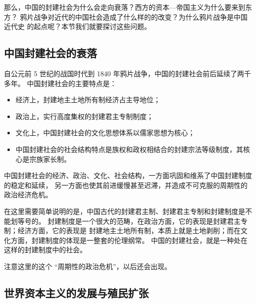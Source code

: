 \documentclass[utf-8, 10pt]{article}
\begin{document}
那么，中国的封建社会为什么会走向衰落？西方的资本—帝国主义为什么要来到东方？
鸦片战争对近代的中国社会造成了什么样的的改变？为什么鸦片战争是中国近代史
的起点呢？本节我们就要探讨这些问题。

\subsection{中国封建社会的衰落}


自公元前 5 世纪的战国时代到 1840 年鸦片战争，中国的封建社会前后延续了两千多年。
中国封建社会的主要特点是：
\begin{itemize}[itemsep=0pt]
    \item 经济上，封建地主土地所有制经济占主导地位；
    \item 政治上，实行高度集权的封建君主专制制度；
    \item 文化上，中国封建社会的文化思想体系以儒家思想为核心；
    \item 中国封建社会的社会结构特点是族权和政权相结合的封建宗法等级制度，其核心是宗族家长制。
\end{itemize}
中国封建社会的经济、政治、文化、社会结构，一方面巩固和维系了中国封建制度的稳定和延续，
另一方面也使其前进缓慢甚至迟滞，并造成不可克服的周期性的政治经济危机。
\begin{remark}
    在这里需要简单说明的是，中国古代的封建君主制、封建君主专制和封建制度是不能划等号的。
    封建制度是一个很大的范畴，在政治方面，它的表现是封建君主专制；经济方面，它的表现是
    封建地主土地所有制，本质上就是土地剥削；而在文化方面，封建制度的体现是一整套的伦理纲常。
    中国的封建社会，就是一种处在这样的封建制度中的社会。
\end{remark}
\begin{remark}
    注意这里的这个 “周期性的政治危机”，以后还会出现。
\end{remark}

\subsection{世界资本主义的发展与殖民扩张}
\end{document}
